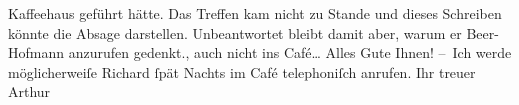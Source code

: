 \begin{ledgroupsized}[t]{13cm}
{{{                        Kaffeehaus geführt hätte. Das Treffen kam nicht zu Stande und dieses
                        Schreiben könnte die Absage darstellen. Unbeantwortet bleibt damit aber,
                        warum er Beer-Hofmann anzurufen
                        gedenkt.}}}\label{K_L00997_1h}, auch nicht ins Café{\dots}\pend
           \pstart
           Alles Gute Ihnen!\pend
           \pstart
           – Ich werde möglicherweiſe Richard ſpät
                    Nachts im Café te{\pb}lephoniſch anrufen.\pend
           \pstart
           Ihr treuer{\\}\spacefill\mbox{Arthur}\pend
           \endnumbering{}\end{ledgroupsized}  \newcommand{\dateiname}{L00997}\newcommand{\titel}{Arthur Schnitzler an Hugo von Hofmannsthal, [18. 11. 1899?]}\newcommand{\editorInnen}{Martin Anton Müller und Gerd-Hermann Susen}
      